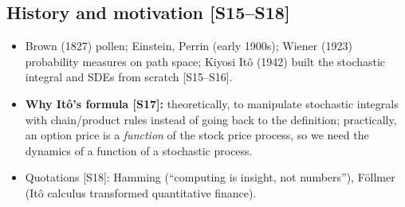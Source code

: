 \documentclass[10pt]{article}
\begin{document}
\subsection{History and motivation [S15--S18]}
\begin{itemize}
\item Brown (1827) pollen; Einstein, Perrin (early 1900s); Wiener (1923) probability measures on path space; Kiyosi It\^o (1942) built the stochastic integral and SDEs from scratch [S15--S16].
\item \textbf{Why It\^o's formula [S17]:} theoretically, to manipulate stochastic integrals with chain/product rules instead of going back to the definition; practically, an option price is a \emph{function} of the stock price process, so we need the dynamics of a function of a stochastic process.
\item Quotations [S18]: Hamming (``computing is insight, not numbers''), F\"ollmer (It\^o calculus transformed quantitative finance).
\end{itemize}
\end{document}
